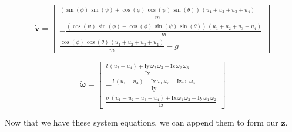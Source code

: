 \documentclass{article}
\begin{document}
\begin{equation}
    \dot{\boldsymbol{v}} = 
    \begin{bmatrix}
        \frac{{\left(\sin \left(\phi \right)\,\sin \left(\psi \right)+\cos \left(\phi \right)\,\cos \left(\psi \right)\,\sin \left(\theta \right)\right)}\,{\left(u_1 +u_2 +u_3 +u_4 \right)}}{m}\\
        -\frac{{\left(\cos \left(\psi \right)\,\sin \left(\phi \right)-\cos \left(\phi \right)\,\sin \left(\psi \right)\,\sin \left(\theta \right)\right)}\,{\left(u_1 +u_2 +u_3 +u_4 \right)}}{m}\\
        \frac{\cos \left(\phi \right)\,\cos \left(\theta \right)\,{\left(u_1 +u_2 +u_3 +u_4 \right)}}{m}-g
    \end{bmatrix}
\end{equation}

\begin{equation}
    \dot{\boldsymbol{\omega}} = 
    \begin{bmatrix}
        \frac{l\,{\left(u_2 -u_4 \right)}+\mathrm{Iy}\,\omega_2 \,\omega_3 -\mathrm{Iz}\,\omega_2 \,\omega_3 }{\mathrm{Ix}}\\
        -\frac{l\,{\left(u_1 -u_3 \right)}+\mathrm{Ix}\,\omega_1 \,\omega_3 -\mathrm{Iz}\,\omega_1 \,\omega_3 }{\mathrm{Iy}}\\
        \frac{\sigma \,{\left(u_1 -u_2 +u_3 -u_4 \right)}+\mathrm{Ix}\,\omega_1 \,\omega_2 -\mathrm{Iy}\,\omega_1 \,\omega_2 }{\mathrm{Iz}}
    \end{bmatrix}
\end{equation}

Now that we have these system equations, we can append them to form our $\dot{\boldsymbol{z}}$.
\end{document}
